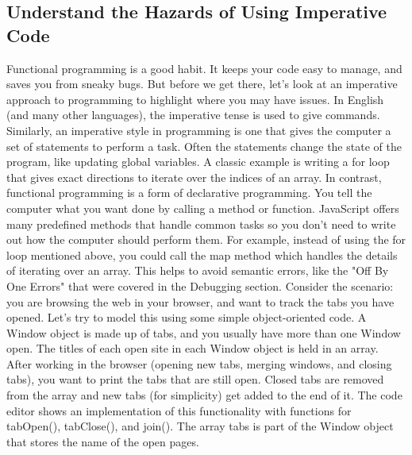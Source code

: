 \documentclass{article}%
\begin{document}
%
\subsection{Understand the Hazards of Using Imperative Code}%
\label{subsec:UnderstandtheHazardsofUsingImperativeCode}%
Functional programming is a good habit. It keeps your code easy to manage, and saves you from sneaky bugs. But before we get there, let's look at an imperative approach to programming to highlight where you may have issues.\newline%
In English (and many other languages), the imperative tense is used to give commands. Similarly, an imperative style in programming is one that gives the computer a set of statements to perform a task.\newline%
Often the statements change the state of the program, like updating global variables. A classic example is writing a for loop that gives exact directions to iterate over the indices of an array.\newline%
In contrast, functional programming is a form of declarative programming. You tell the computer what you want done by calling a method or function.\newline%
JavaScript offers many predefined methods that handle common tasks so you don't need to write out how the computer should perform them. For example, instead of using the for loop mentioned above, you could call the map method which handles the details of iterating over an array. This helps to avoid semantic errors, like the "Off By One Errors" that were covered in the Debugging section.\newline%
Consider the scenario: you are browsing the web in your browser, and want to track the tabs you have opened. Let's try to model this using some simple object{-}oriented code.\newline%
A Window object is made up of tabs, and you usually have more than one Window open. The titles of each open site in each Window object is held in an array. After working in the browser (opening new tabs, merging windows, and closing tabs), you want to print the tabs that are still open. Closed tabs are removed from the array and new tabs (for simplicity) get added to the end of it.\newline%
The code editor shows an implementation of this functionality with functions for tabOpen(), tabClose(), and join(). The array tabs is part of the Window object that stores the name of the open pages.\newline%
\end{document}
